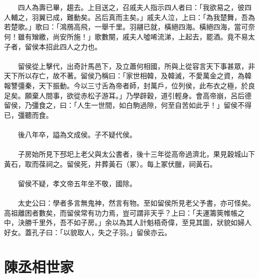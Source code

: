 \\\\
　　四人為壽已畢，趨去。上目送之，召戚夫人指示四人者曰：「我欲易之，彼四人輔之，羽翼已成，難動矣。呂后真而主矣。」戚夫人泣，上曰：「為我楚舞，吾為若楚歌。」歌曰：「鴻鴈高飛，一舉千里。羽翮已就，橫絕四海。橫絕四海，當可奈何！雖有矰繳，尚安所施！」歌數闋，戚夫人噓唏流涕，上起去，罷酒。竟不易太子者，留侯本招此四人之力也。
\\\\
　　留侯從上擊代，出奇計馬邑下，及立蕭何相國，所與上從容言天下事甚眾，非天下所以存亡，故不著。留侯乃稱曰：「家世相韓，及韓滅，不愛萬金之資，為韓報讐彊秦，天下振動。今以三寸舌為帝者師，封萬戶，位列侯，此布衣之極，於良足矣。願棄人間事，欲從赤松子游耳。」乃學辟穀，道引輕身。會高帝崩，呂后德留侯，乃彊食之，曰：「人生一世間，如白駒過隙，何至自苦如此乎！」留侯不得已，彊聽而食。
\\\\
　　後八年卒，謚為文成侯。子不疑代侯。
\\\\
　　子房始所見下邳圯上老父與太公書者，後十三年從高帝過濟北，果見穀城山下黃石，取而葆祠之。留侯死，并葬黃石（冢）。每上冢伏臘，祠黃石。
\\\\
　　留侯不疑，孝文帝五年坐不敬，國除。
\\\\
　　太史公曰：學者多言無鬼神，然言有物。至如留侯所見老父予書，亦可怪矣。高祖離困者數矣，而留侯常有功力焉，豈可謂非天乎？上曰：「夫運籌筴帷帳之中，決勝千里外，吾不如子房。」余以為其人計魁梧奇偉，至見其圖，狀貌如婦人好女。蓋孔子曰：「以貌取人，失之子羽。」留侯亦云。


\section{陳丞相世家}

